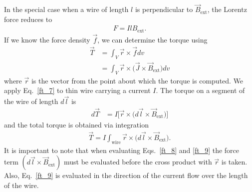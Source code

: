 \documentclass[11pt,a4paper,oneside]{book}
\numberwithin{equation}{section}
\theoremstyle{it}
\theoremstyle{definition}
\begin{document}
In the special case when a wire of length $l$ is perpendicular to $\vec{B}_{\text{ext}}$, the Lorentz force reduces to
 \begin{equation}\label{ft_6}
	\begin{aligned}
		F = Il{B}_{\text{ext}}.
	\end{aligned}
\end{equation}
If we know the force density $\vec{f}$, we can determine the torque using 
 \begin{equation}\label{ft_7}
	\begin{aligned}
		\vec{T} &= \int_{V}\vec{r}\times\vec{f}dv \\[6pt]
		&=\int_{V}\vec{r}\times\big(\vec{J}\times\vec{B}_{\text{ext}}\big)dv
	\end{aligned}
\end{equation}
where $\vec{r}$ is the vector from the point about which the torque is computed. We apply Eq.~\eqref{ft_7} to thin wire carrying a current $I$. The torque on a segment of the wire of length $d\vec{l}$ is
 \begin{equation}\label{ft_8}
	\begin{aligned}
		d\vec{T} &= I\Big[\vec{r}\times\big(d\vec{l}\times\vec{B}_{\text{ext}}\big)\Big]
	\end{aligned}
\end{equation}
and the total torque is obtained via integration
 \begin{equation}\label{ft_9}
	\begin{aligned}
		\vec{T}=I\int_{\text{wire}}\vec{r}\times\big(d\vec{l}\times\vec{B}_{\text{ext}}\big).
	\end{aligned}
\end{equation}
It is important to note that when evaluating Eqs.~\eqref{ft_8} and \ref{ft_9} the force term $(d\vec{l}\times\vec{B}_{\text{ext}})$ must be evaluated before the cross product with $\vec{r}$ is taken. Also, Eq.~\eqref{ft_9} is evaluated in the direction of the current flow over the length of the wire.
\end{document}
